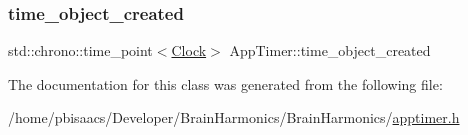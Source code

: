 \subsubsection{\texorpdfstring{time\+\_\+object\+\_\+created}{time\_object\_created}}
{\footnotesize\ttfamily std\+::chrono\+::time\+\_\+point$<$\mbox{\hyperlink{universe_8h_a0ef8d951d1ca5ab3cfaf7ab4c7a6fd80}{Clock}}$>$ App\+Timer\+::time\+\_\+object\+\_\+created\hspace{0.3cm}{\ttfamily [private]}}



The documentation for this class was generated from the following file\+:\begin{DoxyCompactItemize}
\item 
/home/pbisaacs/\+Developer/\+Brain\+Harmonics/\+Brain\+Harmonics/\mbox{\hyperlink{apptimer_8h}{apptimer.\+h}}\end{DoxyCompactItemize}
